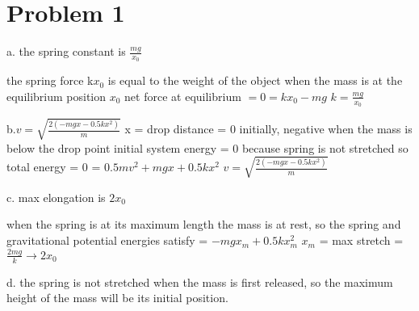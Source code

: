 \chapter{Problem 1}
\label{Problem 1}
a. the spring constant is $\frac{mg}{x_{0}}$\newline

the spring force k$x_{0}$ is equal to the weight of the object\newline
when the mass is at the equilibrium position $x_{0}$\newline
net force at equilibrium $= 0 = kx_{0} - mg$\newline
$k = \frac{mg}{x_{0}}$\newline

b.$v = \sqrt{\frac{2(-mgx - 0.5kx^{2})}{m}}$ \newline
x = drop distance = $0$ initially, negative when the mass\newline
is below the drop point\newline
initial system energy = 0 because spring is not stretched\newline
so total energy = 0 = $0.5mv^{2} + mgx + 0.5kx^{2}$\newline
$v = \sqrt{\frac{2(-mgx - 0.5kx^{2})}{m}}$

c. max elongation is $2x_{0}$\newline

when the spring is at its maximum length the mass is\newline
at rest, so the spring and gravitational potential\newline
energies satisfy = $-mgx_{m} + 0.5kx_{m}^{2}$\newline
$x_{m}$ = max stretch = $\frac{2mg}{k} \rightarrow 2x_{0}$\newline
                                                                          
d. the spring is not stretched when the mass is first\newline
released, so the maximum height of the mass will be\newline
its initial position.

